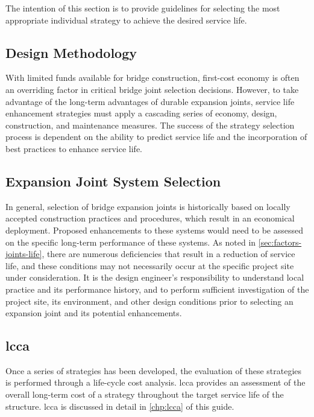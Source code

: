 The intention of this section is to provide guidelines for selecting the most appropriate individual strategy to achieve the desired service life.

\subsection{Design Methodology}
With limited funds available for bridge construction, first-cost economy is often an overriding factor in critical bridge joint selection decisions. However, to take advantage of the long-term advantages of durable expansion joints, service life enhancement strategies must apply a cascading series of economy, design, construction, and maintenance measures. The success of the strategy selection process is dependent on the ability to predict service life and the incorporation of best practices to enhance service life.

\subsection{Expansion Joint System Selection}
In general, selection of bridge expansion joints is historically based on locally accepted construction practices and procedures, which result in an economical deployment. Proposed enhancements to these systems would need to be assessed on the specific long-term performance of these systems. As noted in \cref{sec:factors-joints-life}, there are numerous deficiencies that result in a reduction of service life, and these conditions may not necessarily occur at the specific project site under consideration. It is the design engineer’s responsibility to understand local practice and its performance history, and to perform sufficient investigation of the project site, its environment, and other design conditions prior to selecting an expansion joint and its potential enhancements.


\subsection{\texorpdfstring{\acrfull*{lcca}}{全生命周期成本分析}}
Once a series of strategies has been developed, the evaluation of these strategies is performed through a life-cycle cost analysis. \acrlong*{lcca} provides an assessment of the overall long-term cost of a strategy throughout the target service life of the structure. \acrlong*{lcca} is discussed in detail in \cref{chp:lcca} of this guide.

